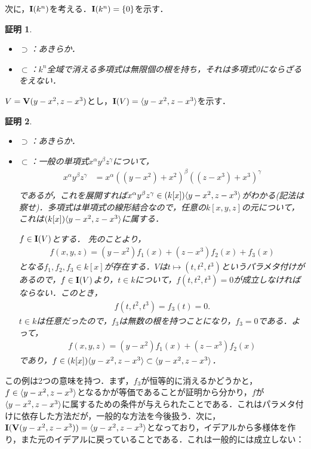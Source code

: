 \documentclass[9pt]{ltjsarticle}
\theoremstyle{break}
\theoremstyle{break}
\theoremstyle{break}
\theoremstyle{break}
\theoremstyle{break}
\theoremstyle{break}
\theoremstyle{break}
\theoremstyle{break}
\theoremstyle{break}
\theoremstyle{break}
\theoremstyle{break}
\theoremstyle{break}
\theoremstyle{break}
\theoremstyle{break}
\theoremstyle{break}
\theoremstyle{nonumberbreak}
\newtheorem{myproof}{証明}
\theoremstyle{nonumberbreak}
\begin{document}
次に，$\textbf I(k^n)$を考える．$\textbf I(k^n)=\{0\}$を示す．
\begin{myproof}
 \begin{itemize}
  \item $\supset$：あきらか．
  \item $\subset$：$k^n$全域で消える多項式は無限個の根を持ち，それは多項式0にならざるをえない．
 \end{itemize}
\end{myproof}

$V=\textbf V(y-x^2,z-x^3)$とし，$\textbf I(V)=\langle y-x^2,z-x^3 \rangle$を示す．
\begin{myproof}
 \begin{itemize}
  \item $\supset$：あきらか．
  \item $\subset$：一般の単項式$x^\alpha y^\beta z^\gamma$について，
\begin{align}
 x^\alpha y^\beta z^\gamma
&=
x^\alpha ((y - x^2) + x^2)^\beta  ((z-x^3)+x^3)^\gamma\\
\end{align}
であるが，これを展開すれば$x^\alpha y^\beta z^\gamma \in (k[x])\langle y-x^2,z-x^3 \rangle$がわかる(記法は察せ)．多項式は単項式の線形結合なので，任意の$k[x,y,z]$の元について，これは$(k[x])\langle y-x^2,z-x^3 \rangle$に属する．

$f\in \textbf I (V)$とする．
先のことより，
\begin{align}
 f(x,y,z) = (y-x^2)f_1(x) + (z-x^3)f_2(x) + f_3(x)
\end{align}
となる$f_1,f_2,f_3\in k[x]$が存在する．$V$は$t\mapsto (t,t^2,t^3)$というパラメタ付けがあるので，$f\in \textbf I(V)$より，$t\in k$について，$f(t,t^2,t^3)=0$が成立しなければならない．このとき，
\begin{align}
 f(t,t^2,t^3) = f_3(t) = 0.
\end{align}
$t\in k$は任意だったので，$f_3$は無数の根を持つことになり，$f_3=0$である．よって，
\begin{align}
 f(x,y,z) = (y-x^2)f_1(x) + (z-x^3)f_2(x)
\end{align}
であり，$f\in (k[x])\langle y-x^2,z-x^3 \rangle \subset \langle y-x^2,z-x^3 \rangle$．
 \end{itemize}
\end{myproof}
この例は2つの意味を持つ．まず，$f_3$が恒等的に消えるかどうかと，$f\in \langle y-x^2,z-x^3 \rangle$となるかが等価であることが証明から分かり，$f$が$\langle y-x^2,z-x^3 \rangle$に属するための条件が与えられたことである．これはパラメタ付けに依存した方法だが，一般的な方法を今後扱う．次に，$\textbf I(\textbf V(y-x^2,z-x^3))=\langle y-x^2,z-x^3 \rangle$となっており，イデアルから多様体を作り，また元のイデアルに戻っていることである．これは一般的には成立しない：
\end{document}

